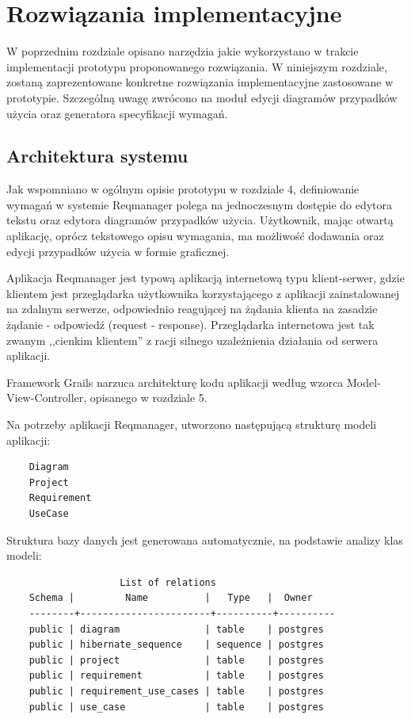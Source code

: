 \chapter{Rozwiązania implementacyjne}
  
  W poprzednim rozdziale opisano narzędzia jakie wykorzystano w trakcie implementacji prototypu proponowanego rozwiązania. W niniejszym rozdziale, zostaną zaprezentowane konkretne rozwiązania implementacyjne zastosowane w prototypie. Szczególną uwagę zwrócono na moduł edycji diagramów przypadków użycia oraz generatora specyfikacji wymagań.

  \section{Architektura systemu}
    Jak wspomniano w ogólnym opisie prototypu w rozdziale 4, definiowanie wymagań w systemie Reqmanager polega na jednoczesnym dostępie do edytora tekstu oraz edytora diagramów przypadków użycia. Użytkownik, mając otwartą aplikację, oprócz tekstowego opisu wymagania, ma możliwość dodawania oraz edycji przypadków użycia w formie graficznej.

    Aplikacja Reqmanager jest typową aplikacją internetową typu klient-serwer, gdzie klientem jest przeglądarka użytkownika korzystającego z aplikacji zainstalowanej na zdalnym serwerze, odpowiednio reagującej na żądania klienta na zasadzie żądanie - odpowiedź (request - response). Przeglądarka internetowa jest tak zwanym ,,cienkim klientem'' z racji silnego uzależnienia działania od serwera aplikacji. 
    
    Framework Grails narzuca architekturę kodu aplikacji według wzorca Model-View-Controller, opisanego w rozdziale 5.  

    Na potrzeby aplikacji Reqmanager, utworzono następującą strukturę modeli aplikacji:

    \begin{verbatim}
    Diagram 
    Project
    Requirement
    UseCase
    \end{verbatim}

    Struktura bazy danych jest generowana automatycznie, na podstawie analizy klas modeli:

    \begin{verbatim}
                    List of relations
    Schema |         Name          |   Type   |  Owner
    --------+-----------------------+----------+----------
    public | diagram               | table    | postgres
    public | hibernate_sequence    | sequence | postgres
    public | project               | table    | postgres
    public | requirement           | table    | postgres
    public | requirement_use_cases | table    | postgres
    public | use_case              | table    | postgres
    \end{verbatim}

